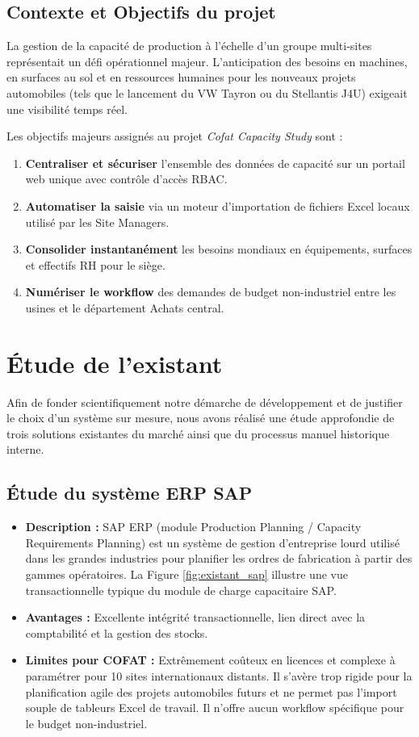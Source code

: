 \subsection{Contexte et Objectifs du projet}
La gestion de la capacité de production à l'échelle d'un groupe multi-sites représentait un défi opérationnel majeur. L'anticipation des besoins en machines, en surfaces au sol et en ressources humaines pour les nouveaux projets automobiles (tels que le lancement du VW Tayron ou du Stellantis J4U) exigeait une visibilité temps réel.

Les objectifs majeurs assignés au projet \textit{Cofat Capacity Study} sont :
\begin{enumerate}
    \item \textbf{Centraliser et sécuriser} l'ensemble des données de capacité sur un portail web unique avec contrôle d'accès RBAC.
    \item \textbf{Automatiser la saisie} via un moteur d'importation de fichiers Excel locaux utilisé par les Site Managers.
    \item \textbf{Consolider instantanément} les besoins mondiaux en équipements, surfaces et effectifs RH pour le siège.
    \item \textbf{Numériser le workflow} des demandes de budget non-industriel entre les usines et le département Achats central.
\end{enumerate}

\section{Étude de l'existant}
Afin de fonder scientifiquement notre démarche de développement et de justifier le choix d'un système sur mesure, nous avons réalisé une étude approfondie de trois solutions existantes du marché ainsi que du processus manuel historique interne.

\subsection{Étude du système ERP SAP}
\begin{itemize}
    \item \textbf{Description :} SAP ERP (module Production Planning / Capacity Requirements Planning) est un système de gestion d'entreprise lourd utilisé dans les grandes industries pour planifier les ordres de fabrication à partir des gammes opératoires. La Figure \ref{fig:existant_sap} illustre une vue transactionnelle typique du module de charge capacitaire SAP.
    \item \textbf{Avantages :} Excellente intégrité transactionnelle, lien direct avec la comptabilité et la gestion des stocks.
    \item \textbf{Limites pour COFAT :} Extrêmement coûteux en licences et complexe à paramétrer pour 10 sites internationaux distants. Il s'avère trop rigide pour la planification agile des projets automobiles futurs et ne permet pas l'import souple de tableurs Excel de travail. Il n'offre aucun workflow spécifique pour le budget non-industriel.
\end{itemize}

